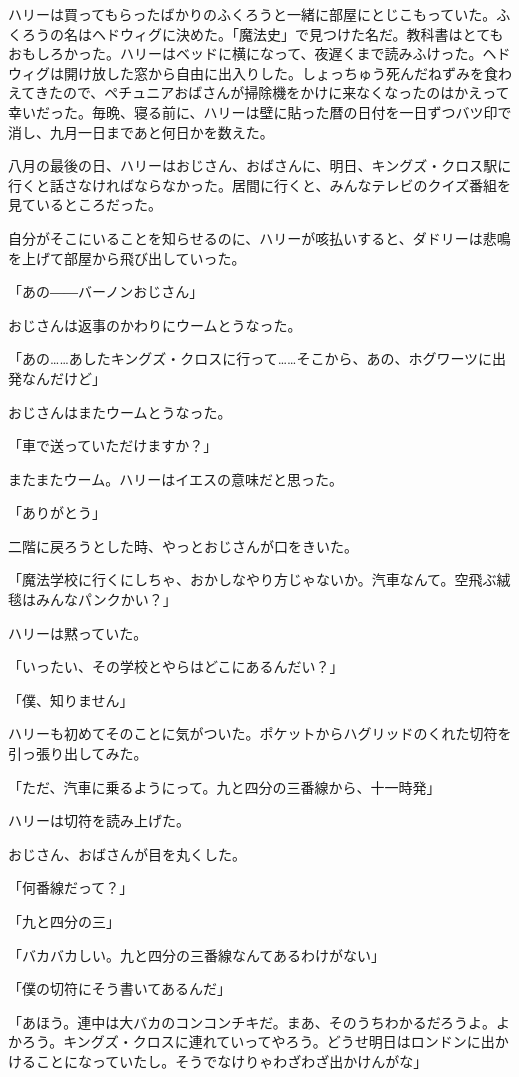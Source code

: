 \documentclass[10pt,a4paper]{article}
\begin{document}
\begin{CJK}{UTF8}{min}
ハリーは買ってもらったばかりのふくろうと一緒に部屋にとじこもっていた。ふくろうの名はヘドウィグに決めた。「魔法史」で見つけた名だ。教科書はとてもおもしろかった。ハリーはベッドに横になって、夜遅くまで読みふけった。ヘドウィグは開け放した窓から自由に出入りした。しょっちゅう死んだねずみを食わえてきたので、ペチュニアおばさんが掃除機をかけに来なくなったのはかえって幸いだった。毎晩、寝る前に、ハリーは壁に貼った暦の日付を一日ずつバツ印で消し、九月一日まであと何日かを数えた。

八月の最後の日、ハリーはおじさん、おばさんに、明日、キングズ・クロス駅に行くと話さなければならなかった。居間に行くと、みんなテレビのクイズ番組を見ているところだった。

自分がそこにいることを知らせるのに、ハリーが咳払いすると、ダドリーは悲鳴を上げて部屋から飛び出していった。

「あの――バーノンおじさん」

おじさんは返事のかわりにウームとうなった。

「あの……あしたキングズ・クロスに行って……そこから、あの、ホグワーツに出発なんだけど」

おじさんはまたウームとうなった。

「車で送っていただけますか？」

またまたウーム。ハリーはイエスの意味だと思った。

「ありがとう」

二階に戻ろうとした時、やっとおじさんが口をきいた。

「魔法学校に行くにしちゃ、おかしなやり方じゃないか。汽車なんて。空飛ぶ絨毯はみんなパンクかい？」

ハリーは黙っていた。

「いったい、その学校とやらはどこにあるんだい？」

「僕、知りません」

ハリーも初めてそのことに気がついた。ポケットからハグリッドのくれた切符を引っ張り出してみた。

「ただ、汽車に乗るようにって。九と四分の三番線から、十一時発」

ハリーは切符を読み上げた。

おじさん、おばさんが目を丸くした。

「何番線だって？」

「九と四分の三」

「バカバカしい。九と四分の三番線なんてあるわけがない」

「僕の切符にそう書いてあるんだ」

「あほう。連中は大バカのコンコンチキだ。まあ、そのうちわかるだろうよ。よかろう。キングズ・クロスに連れていってやろう。どうせ明日はロンドンに出かけることになっていたし。そうでなけりゃわざわざ出かけんがな」


\end{CJK}
\end{document}
